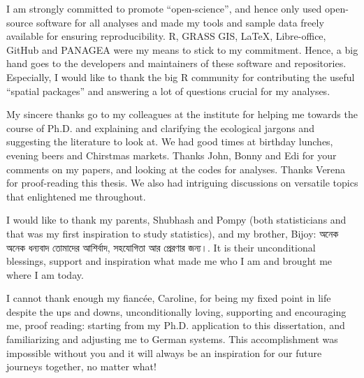 I am strongly committed to promote ``open-science'', and hence only used open-source software for all analyses and made my tools and sample data freely available for ensuring reproducibility. R, GRASS GIS, \LaTeX, Libre-office, GitHub and PANAGEA were my means to stick to my commitment. Hence, a big hand goes to the developers and maintainers of these software and repositories. Especially, I would like to thank the big R community for contributing the useful ``spatial packages'' and answering a lot of questions crucial for my analyses.

My sincere thanks go to my colleagues at the institute for helping me towards the course of Ph.D. and explaining and clarifying the ecological jargons and suggesting the literature to look at. We had good times at birthday lunches, evening beers and Chirstmas markets. Thanks John, Bonny and Edi for your comments on my papers, and looking at the codes for analyses. Thanks Verena for proof-reading this thesis. We also had intriguing discussions on versatile topics that enlightened me throughout.

I would like to thank my parents, Shubhash and Pompy (both statisticians and that was my first inspiration to study statistics), and my brother, Bijoy: {\bengalifont অনেক অনেক ধন্যবাদ তোমাদের আশির্বাদ, সহযোগিতা আর প্রেরণার জন্য।}. It is their unconditional blessings, support and inspiration what made me who I am and brought me where I am today.

I cannot thank enough my fiancée, Caroline, for being my fixed point in life despite the ups and downs, unconditionally loving, supporting and encouraging me, proof reading: starting from my Ph.D. application to this dissertation, and familiarizing and adjusting me to German systems. This accomplishment was impossible without you and it will always be an inspiration for our future journeys together, no matter what!